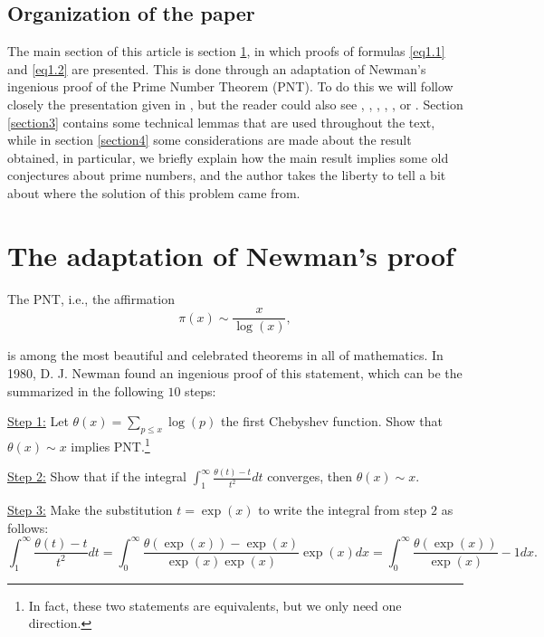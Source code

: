 \documentclass[11pt]{amsart}
\numberwithin{equation}{section}
\newcommand{\disum}{\displaystyle \sum}
\newcommand{\diint}{\displaystyle \int}
\newcommand{\difrac}{\displaystyle \frac}
\begin{document}
\subsection{Organization of the paper}

The main section of this article is section \ref{section2}, in which proofs of formulas \ref{eq1.1} and \ref{eq1.2} are presented. This is done through an adaptation of Newman's ingenious proof \cite{Newman} of the Prime Number Theorem (PNT). To do this we will follow closely the presentation given in \cite{Sutherland}, but the reader could also see \cite{BN}, \cite{Jameson}, \cite{Keng}, \cite{KL}, \cite{Lang}, \cite{ORourke} or \cite{Zagier}. Section \ref{section3} contains some technical lemmas that are used throughout the text, while in section \ref{section4} some considerations are made about the result obtained, in particular, we briefly explain how the main result implies some old conjectures about prime numbers, and the author takes the liberty to tell a bit about where the solution of this problem came from. \vspace{10mm}

\makeatletter
\enddoc@text
\let\enddoc@text\empty %
\makeatother

\newpage

\section{The adaptation of Newman's proof} \label{section2}

The PNT, i.e., the affirmation $$\pi(x) \sim \difrac{x}{\log(x)},$$

\noindent is among the most beautiful and celebrated theorems in all of mathematics. In 1980, D. J. Newman found an ingenious proof of this statement, which can be the summarized in the following $10$ steps:

\noindent \underline{Step 1:} Let $\theta(x) = \disum_{p \leq x} \log(p)$ the first Chebyshev function. Show that $\theta(x) \sim x$ implies PNT.\footnote{In fact, these two statements are equivalents, but we only need one direction.}

\noindent \underline{Step 2:} Show that if the integral $\diint_{1}^{\infty} \difrac{\theta(t) - t}{t^2} dt$ converges, then $\theta(x) \sim x$.

\noindent \underline{Step 3:} Make the substitution $t = \exp(x)$ to write the integral from step $2$ as follows: $$\diint_{1}^{\infty} \difrac{\theta(t) - t}{t^2} dt = \diint_{0}^{\infty} \difrac{\theta(\exp(x)) - \exp(x)}{\exp(x)\exp(x)} \exp(x) dx = \diint_{0}^{\infty} \difrac{\theta(\exp(x))}{\exp(x)} - 1 dx.$$
\end{document}
